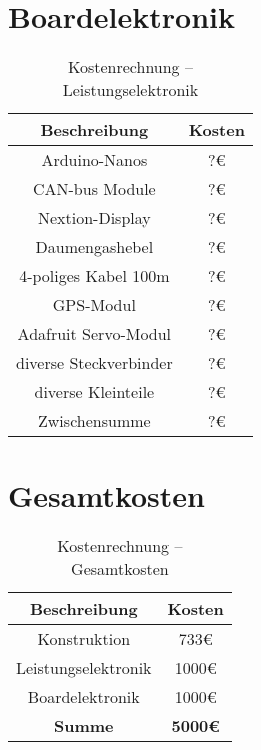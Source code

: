 \section{Boardelektronik}
\begin{table}[H]
    \centering
    \begin{tabular}{|c|c|}
        \hline
        \textbf{Beschreibung} & \textbf{Kosten}\\\hline
        Arduino-Nanos & ?\euro\\
        CAN-bus Module & ?\euro\\
        Nextion-Display & ?\euro\\
        Daumengashebel & ?\euro\\
        4-poliges Kabel 100m & ?\euro\\
        GPS-Modul & ?\euro\\
        Adafruit Servo-Modul & ?\euro\\
        diverse Steckverbinder & ?\euro\\
        diverse Kleinteile & ?\euro\\
        \hline
        Zwischensumme & ?\euro\\\hline
    \end{tabular}
    \caption{Kostenrechnung -- Leistungselektronik}
\end{table}

\section{Gesamtkosten}
\begin{table}[H]
    \centering
    \begin{tabular}{|c|c|}
        \hline
        \textbf{Beschreibung} & \textbf{Kosten}\\\hline
        Konstruktion & 733\euro\\
        Leistungselektronik & 1000\euro\\
        Boardelektronik & 1000\euro\\
        \hline
        \textbf{Summe} & \textbf{5000\euro}\\\hline
    \end{tabular}
    \caption{Kostenrechnung -- Gesamtkosten}
\end{table}
